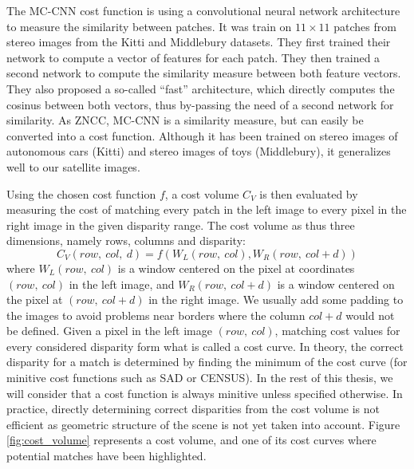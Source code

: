 \begin{example}
	The MC-CNN cost function \cite{zbontar_stereo_2016} is using a convolutional neural network architecture to measure the similarity between patches. It was train on $11\times 11$ patches from stereo images from the Kitti \cite{geiger_vision_2013, menze_object_2015} and Middlebury \cite{scharstein_taxonomy_2001,scharstein_high-accuracy_2003,hirschmuller_evaluation_2007,scharstein_learning_2007,scharstein_high-resolution_2014} datasets. They first trained their network to compute a vector of features for each patch. They then trained a second network to compute the similarity measure between both feature vectors. They also proposed a so-called ``fast'' architecture, which directly computes the cosinus between both vectors, thus by-passing the need of a second network for similarity. As ZNCC, MC-CNN is a similarity measure, but can easily be converted into a cost function. Although it has been trained on stereo images of autonomous cars (Kitti) and stereo images of toys (Middlebury), it generalizes well to our satellite images.
\end{example}
	
Using the chosen cost function $f$, a cost volume $C_V$ is then evaluated by measuring the cost of matching every patch in the left image to every pixel in the right image in the given disparity range. The cost volume as thus three dimensions, namely rows, columns and disparity:
\begin{equation*}
    C_V(row, ~col, ~d) = f(W_L(row, ~col),  W_R(row, ~col+d))
\end{equation*}
where $W_L(row, ~col)$ is a window centered on the pixel at coordinates $(row, ~col)$ in the left image, and $W_R(row, ~col+d)$ is a window centered on the pixel at $(row, ~col+d)$ in the right image. We usually add some padding to the images to avoid problems near borders where the column $col+d$ would not be defined. Given a pixel in the left image $(row, ~col)$, matching cost values for every considered disparity form what is called a cost curve. In theory, the correct disparity for a match is determined by finding the minimum of the cost curve (for minitive cost functions such as SAD or CENSUS). In the rest of this thesis, we will consider that a cost function is always minitive unless specified otherwise. In practice, directly determining correct disparities from the cost volume is not efficient as geometric structure of the scene is not yet taken into account. Figure \ref{fig:cost_volume} represents a cost volume, and one of its cost curves where potential matches have been highlighted. 

